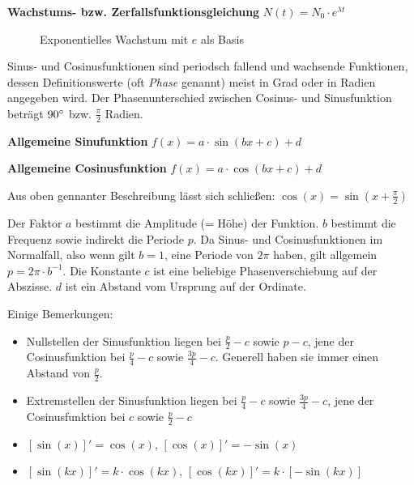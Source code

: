 \textbf{Wachstums- bzw. Zerfallsfunktionsgleichung}  $N(t) = N_{0} \cdot e^{\lambda t}$

\vspace{\parskip}

\begin{figure}[h!]
\centering
\caption*{Exponentielles Wachstum mit $e$ als Basis}
\end{figure}

\pagebreak


Sinus- und Cosinusfunktionen sind periodsch fallend und wachsende Funktionen, dessen Definitionswerte (oft \emph{Phase} genannt) meist in Grad oder in Radien angegeben wird. Der Phasenunterschied zwischen Cosinus- und Sinusfunktion betr\"{a}gt $90\degree$ bzw. $\frac{\pi}{2}$ Radien.

\textbf{Allgemeine Sinufunktion}  $f(x) = a \cdot \sin(bx + c) + d$

\textbf{Allgemeine Cosinusfunktion}  $f(x) = a \cdot \cos(bx + c) + d$

Aus oben gennanter Beschreibung l\"{a}sst sich schlie\ss{}en: $\cos(x) = \sin(x + \frac{\pi}{2})$

Der Faktor $a$ bestimmt die Amplitude (= H\"{o}he) der Funktion. $b$ bestimmt die Frequenz sowie indirekt die Periode $p$. Da Sinus- und Cosinusfunktionen im Normalfall, also wenn gilt $b=1$, eine Periode von $2\pi$ haben, gilt allgemein $p = 2\pi \cdot b^{-1}$. Die Konstante $c$ ist eine beliebige Phasenverschiebung auf der Abszisse. $d$ ist ein Abstand vom Ursprung auf der Ordinate.

Einige Bemerkungen:

\begin{itemize}
	\item Nullstellen der Sinusfunktion liegen bei $\frac{p}{2} - c$ sowie $p - c$, jene der Cosinusfunktion bei $\frac{p}{4} - c$ sowie $\frac{3p}{4} - c$. Generell haben sie immer einen Abstand von $\frac{p}{2}$.

	\item Extremstellen der Sinusfunktion liegen bei $\frac{p}{4} - c$ sowie $\frac{3p}{4} - c$, jene der Cosinusfunktion bei $c$ sowie $\frac{p}{2} - c$
	
	\item $[\sin(x)]' = \cos(x)$, $[\cos(x)]' = -\sin(x)$

	\item $[\sin(kx)]' = k \cdot \cos(kx)$, $[\cos(kx)]' = k \cdot [-\sin(kx)]$
\end{itemize}

